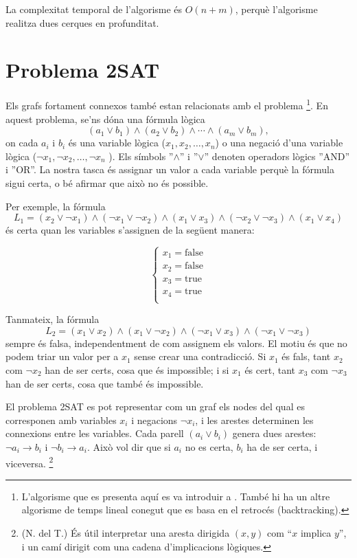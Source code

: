 La complexitat temporal de l'algorisme és $O(n+m)$, perquè l'algorisme
realitza dues cerques en profunditat.

\section{Problema 2SAT}


Els grafs fortament connexos també estan relacionats amb el problema
\footnote{L'algorisme que es presenta aquí es va introduir a
\cite{asp79}. També hi ha un altre algorisme de temps lineal conegut
\cite{eve75} que es basa en el retrocés (backtracking).}. En aquest
problema, se'ns dóna una fórmula lògica
\[
(a_1 \lor b_1) \land (a_2 \lor b_2) \land \cdots \land (a_m \lor b_m),
\]
on cada $a_i$ i $b_i$ és una variable lògica ($x_1,x_2,\ldots,x_n$) o
una negació d'una variable lògica ($\lnot x_1, \lnot x_2, \ldots,
\lnot x_n$ ). Els símbols ''$\land$'' i ''$\lor$'' denoten operadors
lògics ''AND'' i ''OR''. La nostra tasca és assignar un valor a cada
variable perquè la fórmula sigui certa, o bé afirmar que això no és
possible.

Per exemple, la fórmula
\[
L_1 = (x_2 \lor \lnot x_1) \land
      (\lnot x_1 \lor \lnot x_2) \land
      (x_1 \lor x_3) \land
      (\lnot x_2 \lor \lnot x_3) \land
      (x_1 \lor x_4)
\]
és certa quan les variables s'assignen de la següent manera:


\[
\begin{cases}
x_1 = \textrm{false} \\
x_2 = \textrm{false} \\
x_3 = \textrm{true} \\
x_4 = \textrm{true} \\
\end{cases}
\]


Tanmateix, la fórmula
\[
L_2 = (x_1 \lor x_2) \land
      (x_1 \lor \lnot x_2) \land
      (\lnot x_1 \lor x_3) \land
      (\lnot x_1 \lor \lnot x_3)
\]
sempre és falsa, independentment de com assignem els valors. El motiu
és que no podem triar un valor per a $x_1$ sense crear una
contradicció. Si $x_1$ és fals, tant $x_2$ com $\lnot x_2$ han de ser
certs, cosa que és impossible; i si $x_1$ és cert, tant $x_3$ com
$\lnot x_3$ han de ser certs, cosa que també és impossible.

El problema 2SAT es pot representar com un graf els nodes del qual es
corresponen amb variables $x_i$ i negacions $\lnot x_i$, i les arestes
determinen les connexions entre les variables.  Cada parell $(a_i \lor
b_i)$ genera dues arestes: $\lnot a_i \to b_i$ i $\lnot b_i \to
a_i$. Això vol dir que si $a_i$ no es certa, $b_i$ ha de ser certa, i
viceversa. \footnote{(N. del T.) És útil interpretar una aresta dirigida
$(x,y)$ com ``$x$ implica $y$'', i un camí dirigit com una cadena d'implicacions
lògiques.}

